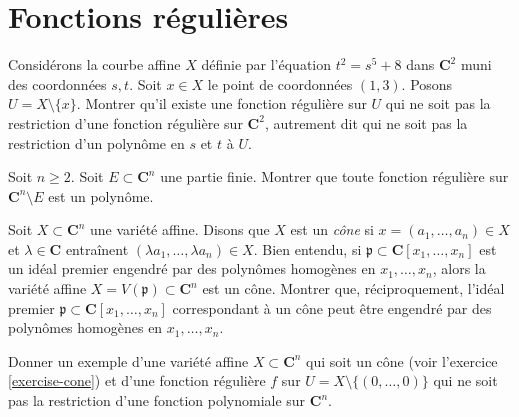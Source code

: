 \section{Fonctions régulières}
\label{section-regular-functions}

\begin{exercise}
\label{exercise-extra-function}
Considérons la courbe affine $X$ définie par l'équation
$t^2 = s^5 + 8$ dans $\mathbf{C}^2$ muni des coordonnées $s, t$.
Soit $x \in X$ le point de coordonnées $(1, 3)$.
Posons $U = X \setminus \{x\}$. Montrer qu'il existe une
fonction régulière sur $U$ qui ne soit pas la restriction
d'une fonction régulière sur $\mathbf{C}^2$, autrement dit qui ne soit pas
la restriction d'un polynôme en $s$ et $t$ à $U$.
\end{exercise}

\begin{exercise}
\label{exercise-no-extra-function}
Soit $n \geq 2$. Soit $E \subset \mathbf{C}^n$ une partie finie.
Montrer que toute fonction régulière sur $\mathbf{C}^n \setminus E$
est un polynôme.
\end{exercise}

\begin{exercise}
\label{exercise-cone}
Soit $X \subset \mathbf{C}^n$ une variété affine. Disons que $X$ est un
{\it cône} si $x = (a_1, \ldots, a_n) \in X$ et $\lambda \in \mathbf{C}$
entraînent $(\lambda a_1, \ldots, \lambda a_n) \in X$.
Bien entendu, si $\mathfrak p \subset \mathbf{C}[x_1, \ldots, x_n]$
est un idéal premier engendré par des polynômes homogènes en $x_1, \ldots, x_n$,
alors la variété affine $X = V(\mathfrak p) \subset \mathbf{C}^n$ est un cône.
Montrer que, réciproquement, l'idéal premier
$\mathfrak p \subset \mathbf{C}[x_1, \ldots, x_n]$
correspondant à un cône peut être engendré par des polynômes homogènes
en $x_1, \ldots, x_n$.
\end{exercise}

\begin{exercise}
\label{exercise-extra-function-cone}
Donner un exemple d'une variété affine $X \subset \mathbf{C}^n$
qui soit un cône (voir l'exercice \ref{exercise-cone})
et d'une fonction régulière $f$ sur $U = X \setminus \{(0, \ldots, 0)\}$
qui ne soit pas la restriction d'une fonction polynomiale
sur $\mathbf{C}^n$.
\end{exercise}

